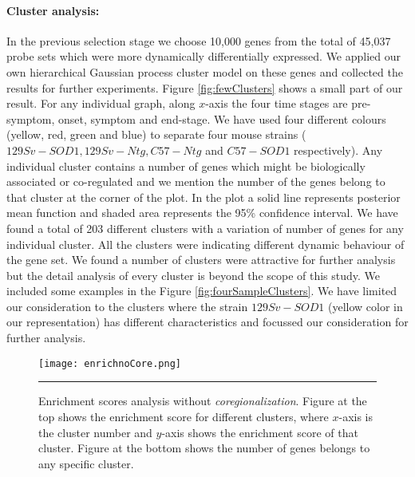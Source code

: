 \paragraph{Cluster analysis:} 
In the previous selection stage we choose 10,000 genes from the total of 45,037 probe sets which were more dynamically differentially expressed. We applied our own hierarchical Gaussian process cluster model on these genes and collected the results for further experiments. Figure \ref{fig:fewClusters} shows a small part of our result. For any individual graph, along $x$-axis the four time stages are pre-symptom, onset, symptom and end-stage. We have used four different colours (yellow, red, green and blue) to separate four mouse strains ($129Sv-SOD1, 129Sv-Ntg, C57-Ntg$ and $C57-SOD1$ respectively). Any individual cluster contains a number of genes which might be biologically associated or co-regulated and we mention the number of the genes belong to that cluster at the corner of the plot. In the plot a solid line represents posterior mean function and shaded area represents the 95\% confidence interval. We have found a total of 203 different clusters with a variation of number of genes for any individual cluster. All the clusters were indicating different dynamic behaviour of the gene set. We found a number of clusters were attractive for further analysis but the detail analysis of every cluster is beyond the scope of this study. We included some examples in the Figure \ref{fig:fourSampleClusters}. We have limited our consideration to the clusters where the strain $129Sv-SOD1$ (yellow color in our representation) has different characteristics and focussed our consideration for further analysis.
\begin{figure}
	\centering
		\texttt{[image: enrichnoCore.png]}
		\rule{35em}{0.5pt}
	\caption[Enrichment scores analysis for different clusters without \emph{coregionalization}]
		{Enrichment scores analysis without \emph{coregionalization}. Figure at the top shows the enrichment score for different clusters, where $x$-axis is the cluster number and $y$-axis shows the  enrichment score of that cluster. Figure at the bottom shows the number of genes belongs to any specific cluster.}
	\label{fig:enrichNoCoregionalization}
\end{figure}

